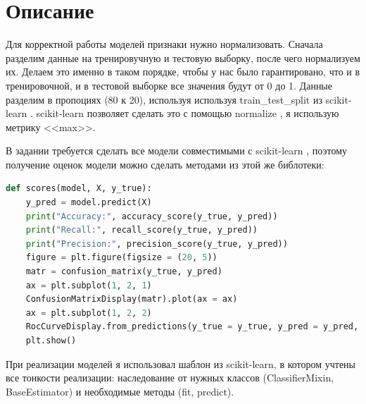 \section{Описание}
Для корректной работы моделей признаки нужно нормализовать. Сначала разделим данные на тренировучную и тестовую выборку, после чего нормализуем их.
Делаем это именно в таком порядке, чтобы у нас было гарантировано, что и в тренировочной, и в тестовой выборке все значения будут от 0 до 1.
Данные разделим в пропоциях (80 к 20), используя используя train\_test\_split из scikit-learn \cite{scikit-split}.
scikit-learn позволяет сделать это с помощью normalize \cite{scikit-normalize}, я использую метрику <<max>>.


В задании требуется сделать все модели совместимыми с scikit-learn \cite{scikit-develop}, поэтому получение оценок модели \cite{ml-metrics} 
можно сделать методами из этой же библотеки:
\begin{lstlisting}[language=Python]
def scores(model, X, y_true):
    y_pred = model.predict(X)
    print("Accuracy:", accuracy_score(y_true, y_pred))
    print("Recall:", recall_score(y_true, y_pred))
    print("Precision:", precision_score(y_true, y_pred))
    figure = plt.figure(figsize = (20, 5))
    matr = confusion_matrix(y_true, y_pred)
    ax = plt.subplot(1, 2, 1)
    ConfusionMatrixDisplay(matr).plot(ax = ax)
    ax = plt.subplot(1, 2, 2)
    RocCurveDisplay.from_predictions(y_true = y_true, y_pred = y_pred, name = "ROC-curve", ax = ax)
    plt.show()
\end{lstlisting}

При реализации моделей я использовал шаблон \cite{scikit-github} из scikit-learn, в котором учтены все тонкости реализации: наследование 
от нужных классов (ClassifierMixin, BaseEstimator) и необходимые методы (fit, predict).
\pagebreak

